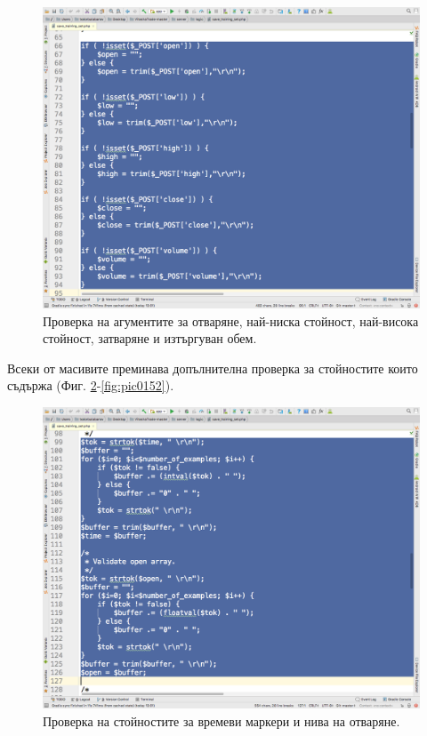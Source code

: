 \documentclass[book,14pt,oneside,openany]{memoir}
\begin{document}
\begin{figure}[h]
  \centering
  \includegraphics[height=0.45\pdfpageheight]{pic0149}
  \caption{Проверка на агументите за отваряне, най-ниска стойност, най-висока стойност, затваряне и изтъргуван обем.}
\label{fig:pic0149}
\end{figure}
\FloatBarrier

Всеки от масивите преминава допълнителна проверка за стойностите които съдържа (Фиг. \ref{fig:pic0150}-\ref{fig:pic0152}).

\begin{figure}[h]
  \centering
  \includegraphics[height=0.45\pdfpageheight]{pic0150}
  \caption{Проверка на стойностите за времеви маркери и нива на отваряне.}
\label{fig:pic0150}
\end{figure}
\FloatBarrier
\end{document}
